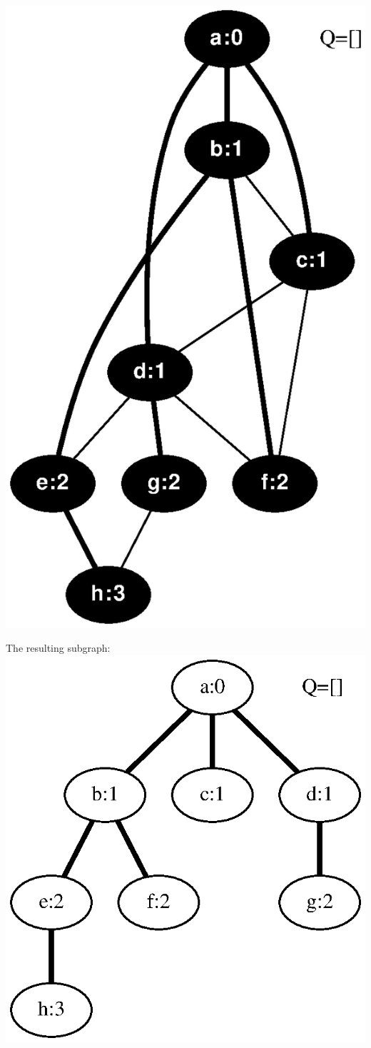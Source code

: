\documentclass{article}
\begin{document}
\includegraphics[width=0.22727272727272727\linewidth]{bfs_undirected_classroom_08.eps}
\vspace{1em}
\begin{minipage}{0.22727272727272727\linewidth}
The resulting subgraph: 
\includegraphics[width=\linewidth]{bfs_undirected_classroom_09.eps}
\end{minipage}
\end{document}
